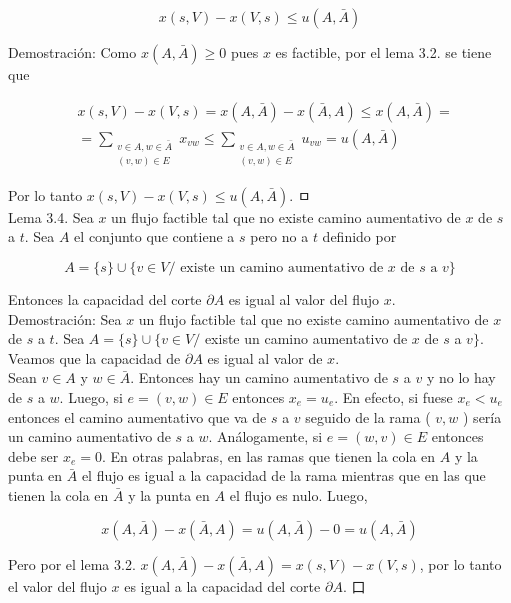 \documentclass[10pt]{article}
\begin{document}
$$
x(s, V)-x(V, s) \leq u(A, \bar{A})
$$

Demostración: Como $x(A, \bar{A}) \geq 0$ pues $x$ es factible, por el lema 3.2. se tiene que

$$
\begin{aligned}
& x(s, V)-x(V, s)=x(A, \bar{A})-x(\bar{A}, A) \leq x(A, \bar{A})= \\
& =\sum_{\substack{v \in A, w \in \bar{A} \\
(v, w) \in E}} x_{v w} \leq \sum_{\substack{v \in A, w \in \bar{A} \\
(v, w) \in E}} u_{v w}=u(A, \bar{A})
\end{aligned}
$$

Por lo tanto $x(s, V)-x(V, s) \leq u(A, \bar{A})$. ㅁ\\
Lema 3.4. Sea $x$ un flujo factible tal que no existe camino aumentativo de $x$ de $s$ a $t$. Sea $A$ el conjunto que contiene a $s$ pero no a $t$ definido por

$$
A=\{s\} \cup\{v \in V / \text { existe un camino aumentativo de } x \text { de } s \text { a } v\}
$$

Entonces la capacidad del corte $\partial A$ es igual al valor del flujo $x$.\\
Demostración: Sea $x$ un flujo factible tal que no existe camino aumentativo de $x$ de $s$ a $t$. Sea $A=\{s\} \cup\{v \in V /$ existe un camino aumentativo de $x$ de $s$ a $v\}$.\\
Veamos que la capacidad de $\partial A$ es igual al valor de $x$.\\
Sean $v \in A$ y $w \in \bar{A}$. Entonces hay un camino aumentativo de $s$ a $v$ y no lo hay de $s$ a $w$. Luego, si $e=(v, w) \in E$ entonces $x_{e}=u_{e}$. En efecto, si fuese $x_{e}<u_{e}$ entonces el camino aumentativo que va de $s$ a $v$ seguido de la rama ( $v, w$ ) sería un camino aumentativo de $s$ a $w$. Análogamente, si $e=(w, v) \in E$ entonces debe ser $x_{e}=0$. En otras palabras, en las ramas que tienen la cola en $A$ y la punta en $\bar{A}$ el flujo es igual a la capacidad de la rama mientras que en las que tienen la cola en $\bar{A}$ y la punta en $A$ el flujo es nulo. Luego,

$$
x(A, \bar{A})-x(\bar{A}, A)=u(A, \bar{A})-0=u(A, \bar{A})
$$

Pero por el lema 3.2. $x(A, \bar{A})-x(\bar{A}, A)=x(s, V)-x(V, s)$, por lo tanto el valor del flujo $x$ es igual a la capacidad del corte $\partial A$. 口
\end{document}
